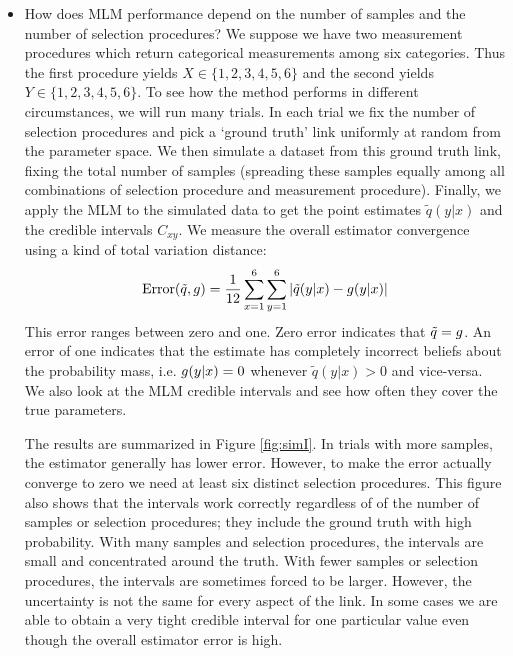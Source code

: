 \begin{itemize}
    \item How does MLM performance depend on the number of samples and the number of selection procedures?  We suppose we have two measurement procedures which return categorical measurements among six categories.  Thus the first procedure yields $X\in \{1,2,3,4,5,6\}$ and the second yields $Y\in \{1,2,3,4,5,6\}$.  To see how the method performs in different circumstances, we will run many trials.  In each trial we fix the number of selection procedures and pick a `ground truth' link uniformly at random from the parameter space.  We then simulate a dataset from this ground truth link, fixing the total number of samples (spreading these samples equally among all combinations of selection procedure and measurement procedure).  Finally, we apply the MLM to the simulated data to get the point estimates $\tilde q(y|x)$ and the credible intervals $C_{x y}$.  We measure the overall estimator convergence using a kind of total variation distance:
    \[
    \mathrm{Error}(\tilde q,g)=\frac{1}{12}\sum_{x=1}^{6}\sum_{y=1}^{6} |\tilde q(y|x) - g(y|x)|
    \]
    This error ranges between zero and one.  Zero error indicates that $\tilde q=g$. An error of one indicates that the estimate has completely incorrect beliefs about the probability mass, i.e. $g(y|x)=0$ whenever $\tilde q(y|x)>0$ and vice-versa.  We also look at the MLM credible intervals and see how often they cover the true parameters.  

    The results are summarized in Figure \ref{fig:simI}.  In trials with more samples, the estimator generally has lower error.  However, to make the error actually converge to zero we need at least six distinct selection procedures.  This figure also shows that the intervals work correctly regardless of of the number of samples or selection procedures; they include the ground truth with high probability.   With many samples and selection procedures, the intervals are small and concentrated around the truth.  With fewer samples or selection procedures, the intervals are sometimes forced to be larger.  However, the uncertainty is not the same for every aspect of the link.  In some cases we are able to obtain a very tight credible interval for one particular value even though the overall estimator error is high.  


\end{itemize}
